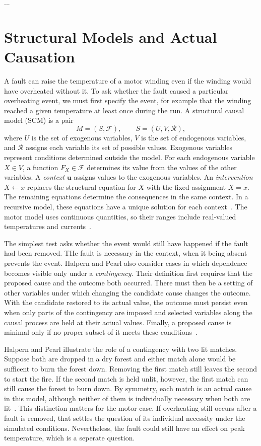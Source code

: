 \documentclass[runningheads]{llncs}
\begin{document}
...


\section{Structural Models and Actual Causation}
A fault can raise the temperature of a motor winding even if the winding
would have overheated without it. To ask whether the fault caused a
particular overheating event, we must first specify the event, for example
that the winding reached a given temperature at least once during the run.
A structural causal model (SCM) is a pair
\[
M=(S,\mathcal{F}), \qquad S=(U,V,\mathcal{R}),
\]
where \(U\) is the set of exogenous variables, \(V\) is the set of
endogenous variables, and \(\mathcal{R}\) assigns each variable its set of
possible values. Exogenous variables represent conditions determined
outside the model. For each endogenous variable \(X\in V\), a function
\(F_X\in\mathcal{F}\) determines its value from the values of the other
variables. A \emph{context} \(\mathbf{u}\) assigns values to the exogenous
variables. An \emph{intervention} \(X\leftarrow x\) replaces the structural
equation for \(X\) with the fixed assignment \(X=x\). The remaining
equations determine the consequences in the same context. In a recursive
model, these equations have a unique solution for each
context~\cite[Sect.~2]{halpern2005,chockler2004}. The motor model uses
continuous quantities, so their ranges include real-valued temperatures
and currents~\cite[Sect.~3.2]{mujic2026}.

The simplest test asks whether the event would still have happened if the
fault had been removed. THe fault is necessary in the context, 
when it being absent prevents the event. Halpern and Pearl also consider
cases in which dependence becomes visible only under a \emph{contingency}.
Their definition first requires that the proposed cause and the outcome
both occurred. There must then be a setting of other variables under which
changing the candidate cause changes the outcome. With the candidate
restored to its actual value, the outcome must persist even when only
parts of the contingency are imposed and selected variables along the
causal process are held at their actual values. Finally, a proposed cause
is minimal only if no proper subset of it meets these
conditions~\cite[Def.~3.1]{halpern2005}.

Halpern and Pearl illustrate the role of a contingency with two lit
matches. Suppose both are dropped in a dry forest and either match alone
would be sufficent to burn the forest down. Removing the first match still leaves
the second to start the fire. If the second match is held unlit, however,
the first match can still cause the forest to burn down. By symmetry, each match is
an actual cause in this model, although neither of them is individually necessary
when both are lit~\cite[Example~3.2]{halpern2005}. This distinction matters
for the motor case. If overheating still occurs after a fault is removed, that
settles the question of its individual necessity under the simulated
conditions. Nevertheless, the fault could still have an effect on peak temperature, which is a seperate question.
\end{document}
